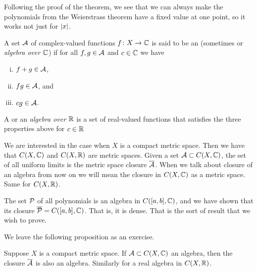 Following the proof of the theorem,
we see that we can always make the polynomials from the Weierstrass theorem
have a fixed value at one point, so it works not just for $\lvert {x} \rvert$.

\begin{defn}
A set ${\mathcal{A}}$ of complex-valued functions $f \colon X \to {\mathbb{C}}$ is said to be an 
\emph{} (sometimes
\emph{} or \emph{algebra over ${\mathbb{C}}$}) if for all $f, g \in {\mathcal{A}}$ and $c \in {\mathbb{C}}$ we have
\begin{enumerate}[(i)]
\item $f+g \in {\mathcal{A}}$,
\item $fg \in {\mathcal{A}}$, and
\item $cg \in {\mathcal{A}}$.
\end{enumerate}
A \emph{} or an
\emph{algebra over ${\mathbb{R}}$} is a set of real-valued
functions that satisfies the three properties above for $c \in {\mathbb{R}}$
\end{defn}

We are interested in the case when
$X$ is a compact metric space.  Then
we have that $C(X,{\mathbb{C}})$ and $C(X,{\mathbb{R}})$ are metric spaces.
Given a set ${\mathcal{A}} \subset C(X,{\mathbb{C}})$, the set of all uniform
limits is the metric space closure $\overline{{\mathcal{A}}}$.
When we talk about closure of an algebra
from now on we will mean the closure in $C(X,{\mathbb{C}})$
as a metric space.  Same for $C(X,{\mathbb{R}})$.

The set ${\mathcal{P}}$ of all polynomials is an algebra in
$C([a,b],{\mathbb{C}})$, and we
have shown that its closure $\overline{{\mathcal{P}}} = C([a,b],{\mathbb{C}})$.
That is, it is dense.  That is the sort of result that we wish to prove.

We leave the following proposition as an exercise.

\begin{prop} \label{prop:closureofalgebra}
Suppose $X$ is a compact metric space.
If ${\mathcal{A}} \subset C(X,{\mathbb{C}})$ an algebra, then the closure $\overline{{\mathcal{A}}}$ is also an algebra.
Similarly for a real algebra in $C(X,{\mathbb{R}})$.
\end{prop}


